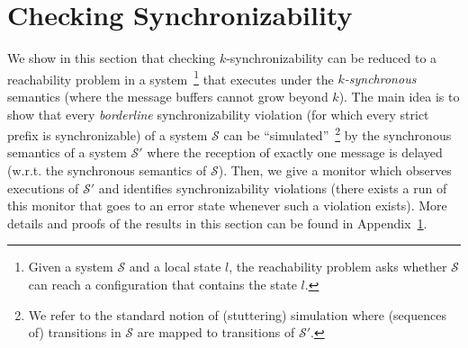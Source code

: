 \section{Checking Synchronizability}\label{sec:verif}

We show in this section that checking $k$-synchronizability can be reduced 
to a reachability problem in a system~\footnote{Given a system $\mathcal{S}$ and a local state $l$, the reachability problem asks whether $\mathcal{S}$ can reach a configuration that contains the state $l$.} that executes under the \emph{$k$-synchronous} semantics 
(where the message buffers cannot grow beyond $k$). The main idea is to show that every
\emph{borderline} synchronizability violation (for which every strict prefix is synchronizable) of a system $\mathcal{S}$ can be ``simulated''~\footnote{We refer to the standard notion of (stuttering) simulation where (sequences of) transitions in $\mathcal{S}$ are mapped to transitions of $\mathcal{S'}$.}
by the synchronous semantics of a system $\mathcal{S'}$ where the reception of exactly one message is delayed (w.r.t. the synchronous semantics of $\mathcal{S}$).
Then, we give a monitor which observes executions of $\mathcal{S'}$ and identifies synchronizability violations
(there exists a run of this monitor that goes to an error state whenever such a violation exists). More details and proofs of the results in this section can be found in Appendix~\ref{sec:verif}.

